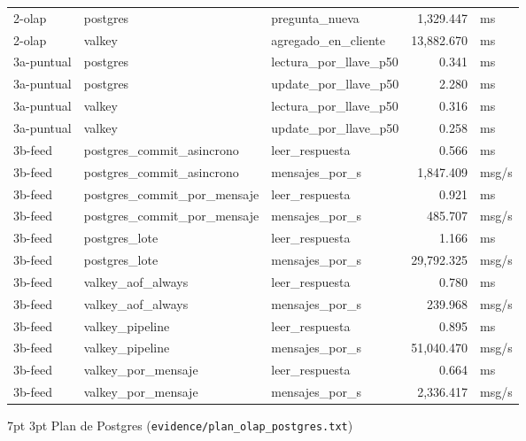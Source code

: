 \documentclass[10pt,letterpaper]{article}
\makeatletter
\renewcommand\section{\@startsection{section}{1}{\z@}%
  {7pt \@plus 2pt \@minus 1pt}{3pt}%
  {\normalfont\normalsize\bfseries\color{acc}}}
\makeatother
\begin{document}
\begin{center}
\begin{tabular}{@{}lllrl@{}}
2-olap & postgres & pregunta\_nueva & 1,329.447 & ms \\
2-olap & valkey & agregado\_en\_cliente & 13,882.670 & ms \\
3a-puntual & postgres & lectura\_por\_llave\_p50 & 0.341 & ms \\
3a-puntual & postgres & update\_por\_llave\_p50 & 2.280 & ms \\
3a-puntual & valkey & lectura\_por\_llave\_p50 & 0.316 & ms \\
3a-puntual & valkey & update\_por\_llave\_p50 & 0.258 & ms \\
3b-feed & postgres\_commit\_asincrono & leer\_respuesta & 0.566 & ms \\
3b-feed & postgres\_commit\_asincrono & mensajes\_por\_s & 1,847.409 & msg/s \\
3b-feed & postgres\_commit\_por\_mensaje & leer\_respuesta & 0.921 & ms \\
3b-feed & postgres\_commit\_por\_mensaje & mensajes\_por\_s & 485.707 & msg/s \\
3b-feed & postgres\_lote & leer\_respuesta & 1.166 & ms \\
3b-feed & postgres\_lote & mensajes\_por\_s & 29,792.325 & msg/s \\
3b-feed & valkey\_aof\_always & leer\_respuesta & 0.780 & ms \\
3b-feed & valkey\_aof\_always & mensajes\_por\_s & 239.968 & msg/s \\
3b-feed & valkey\_pipeline & leer\_respuesta & 0.895 & ms \\
3b-feed & valkey\_pipeline & mensajes\_por\_s & 51,040.470 & msg/s \\
3b-feed & valkey\_por\_mensaje & leer\_respuesta & 0.664 & ms \\
3b-feed & valkey\_por\_mensaje & mensajes\_por\_s & 2,336.417 & msg/s \\
\bottomrule
\end{tabular}
\end{center}

\section{Plan de Postgres (\texttt{evidence/plan\_olap\_postgres.txt})}
\end{document}
